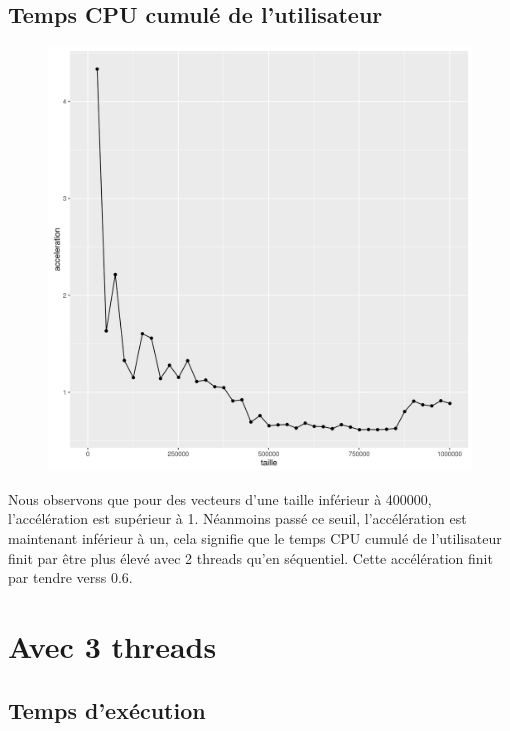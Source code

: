 \documentclass[a4paper,11pt]{scrartcl}
\begin{document}
\subsection{Temps CPU cumul\'e de l'utilisateur}
\begin{figure}[H] \center
   \includegraphics[scale=0.5] {graphes/temps_user_accel2.png}
\end{figure}
Nous observons que pour des vecteurs d'une taille inf\'erieur \`a 400000, l'acc\'el\'eration est sup\'erieur \`a 1. N\'eanmoins pass\'e ce seuil,  l'acc\'el\'eration est maintenant inf\'erieur \`a un, cela signifie que le temps CPU cumul\'e de l'utilisateur finit par \^{e}tre plus \'elev\'e avec 2 threads qu'en s\'equentiel. Cette acc\'el\'eration finit par tendre verss 0.6.


\section{Avec 3 threads}
\subsection{Temps d'ex\'ecution}
\end{document}
